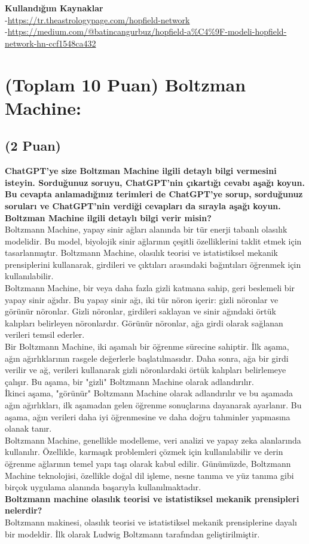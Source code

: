\documentclass[11pt]{article}
\begin{document}
\textbf{Kullandığım Kaynaklar}\\
-\url{https://tr.theastrologypage.com/hopfield-network}\\
-\url{https://medium.com/@batincangurbuz/hopfield-a%C4%9F-modeli-hopfield-network-hn-ccf1548ca432}
\section{(Toplam 10 Puan) Boltzman Machine:}

\subsection{(2 Puan)} \textbf{ChatGPT’ye size Boltzman Machine ilgili detaylı bilgi vermesini isteyin. Sorduğunuz soruyu, ChatGPT'nin çıkartığı cevabı aşağı koyun. Bu cevapta anlamadığınız terimleri de ChatGPT’ye sorup, sorduğunuz soruları ve ChatGPT’nin verdiği cevapları da sırayla aşağı koyun.}\\

\textbf{ Boltzman Machine ilgili detaylı bilgi verir misin?}\\
Boltzmann Machine, yapay sinir ağları alanında bir tür enerji tabanlı olasılık modelidir. Bu model, biyolojik sinir ağlarının çeşitli özelliklerini taklit etmek için tasarlanmıştır. Boltzmann Machine, olasılık teorisi ve istatistiksel mekanik prensiplerini kullanarak, girdileri ve çıktıları arasındaki bağıntıları öğrenmek için kullanılabilir.\\
Boltzmann Machine, bir veya daha fazla gizli katmana sahip, geri beslemeli bir yapay sinir ağıdır. Bu yapay sinir ağı, iki tür nöron içerir: gizli nöronlar ve görünür nöronlar. Gizli nöronlar, girdileri saklayan ve sinir ağındaki örtük kalıpları belirleyen nöronlardır. Görünür nöronlar, ağa girdi olarak sağlanan verileri temsil ederler.\\
Bir Boltzmann Machine, iki aşamalı bir öğrenme sürecine sahiptir. İlk aşama, ağın ağırlıklarının rasgele değerlerle başlatılmasıdır. Daha sonra, ağa bir girdi verilir ve ağ, verileri kullanarak gizli nöronlardaki örtük kalıpları belirlemeye çalışır. Bu aşama, bir "gizli" Boltzmann Machine olarak adlandırılır.\\ 
İkinci aşama, "görünür" Boltzmann Machine olarak adlandırılır ve bu aşamada ağın ağırlıkları, ilk aşamadan gelen öğrenme sonuçlarına dayanarak ayarlanır. Bu aşama, ağın verileri daha iyi öğrenmesine ve daha doğru tahminler yapmasına olanak tanır.\\
Boltzmann Machine, genellikle modelleme, veri analizi ve yapay zeka alanlarında kullanılır. Özellikle, karmaşık problemleri çözmek için kullanılabilir ve derin öğrenme ağlarının temel yapı taşı olarak kabul edilir. Günümüzde, Boltzmann Machine teknolojisi, özellikle doğal dil işleme, nesne tanıma ve yüz tanıma gibi birçok uygulama alanında başarıyla kullanılmaktadır.\\
\textbf{Boltzmann machine olasılık teorisi ve istatistiksel mekanik prensipleri nelerdir?}\\
Boltzmann makinesi, olasılık teorisi ve istatistiksel mekanik prensiplerine dayalı bir modeldir. İlk olarak Ludwig Boltzmann tarafından geliştirilmiştir.
\end{document}
